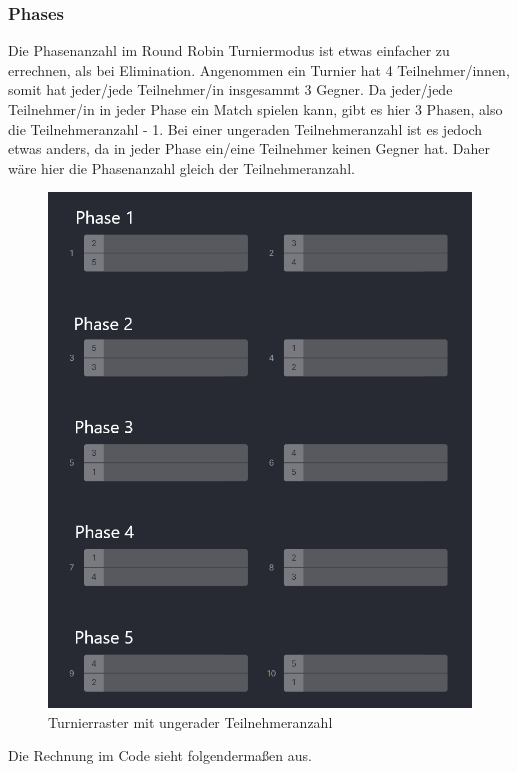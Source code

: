 \subsubsection{Phases}

Die Phasenanzahl im Round Robin Turniermodus ist etwas einfacher zu errechnen, als bei Elimination. Angenommen ein Turnier hat 4 Teilnehmer/innen, somit hat jeder/jede Teilnehmer/in insgesammt 3 Gegner. Da jeder/jede Teilnehmer/in in jeder Phase 
ein Match spielen kann, gibt es hier 3 Phasen, also die Teilnehmeranzahl - 1. Bei einer ungeraden Teilnehmeranzahl ist es jedoch etwas anders, da in jeder Phase ein/eine Teilnehmer keinen Gegner hat. Daher wäre hier die Phasenanzahl gleich 
der Teilnehmeranzahl.

\begin{figure}[H]
    \includegraphics[scale=0.5]{pics/backend/roundrobin/roundrobin_grid_uneven.png}
    \caption{Turnierraster mit ungerader Teilnehmeranzahl\cite{implementation-execution-1}}
\end{figure}

Die Rechnung im Code sieht folgendermaßen aus.

